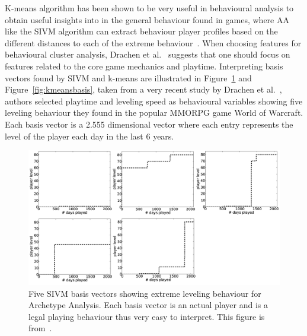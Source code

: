 K-means algorithm has been shown to be very useful in behavioural analysis to obtain useful insights into in the general behaviour found in games, where AA like the SIVM algorithm can extract behaviour player profiles based on the different distances to each of the extreme behaviour~\citep{Drachen:2013}. When choosing features for behavioural cluster analysis, Drachen et al.~\citep{Drachen:2009TGA, Drachen:2012} suggests that one should focus on features related to the core game mechanics and playtime. Interpreting basis vectors found by SIVM and k-means are illustrated in Figure~\ref{fig:sivmbasis} and Figure~\ref{fig:kmeansbasis}, taken from a very recent study by Drachen et al.~\citep{Drachen:2013}, authors selected playtime and leveling speed as behavioural variables showing five leveling behaviour they found in the popular MMORPG game World of Warcraft. Each basis vector is a 2.555 dimensional vector where each entry represents the level of the player each day in the last 6 years.\\


\begin{figure}[here]
\centerline{\includegraphics[width=1.0\textwidth]{Figures/sivmbasis.png}}
\caption{Five SIVM basis vectors showing extreme leveling behaviour for Archetype Analysis. Each basis vector is an actual player and is a legal playing behaviour thus very easy to interpret. This figure is from~\citep{Drachen:2013}.}
\label{fig:sivmbasis}
\end{figure}



